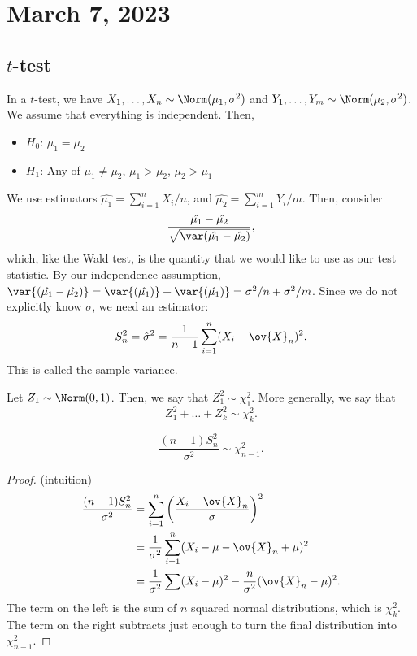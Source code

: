 \section{March 7, 2023}

\subsection{$t$-test}

In a $t$-test, we have $X_1, \hdots, X_n\sim \Norm(\mu_1, \sigma^2)$ and $Y_1, \hdots, Y_m\sim \Norm(\mu_2, \sigma^2)$. We assume that everything is independent. Then,
\begin{itemize}
    \item $H_0$: $\mu_1=\mu_2$
    \item $H_1$: Any of $\mu_1\neq \mu_2$, $\mu_1 > \mu_2$, $\mu_2 > \mu_1$
\end{itemize}

We use estimators $\hat{\mu_1} = \sum_{i=1}^nX_i/n$, and $\hat{\mu_2}=\sum_{i=1}^mY_i/m$. Then, consider
\[\frac{\hat{\mu_1}-\hat{\mu_2}}{\sqrt{\var(\hat{\mu_1}-\hat{\mu_2})}},\]
which, like the Wald test, is the quantity that we would like to use as our test statistic. By our independence assumption, $\var{(\hat{\mu_1}-\hat{\mu_2})} = \var{(\hat{\mu_1})}+\var{(\hat{\mu_1})} = \sigma^2/n + \sigma^2/m$. Since we do not explicitly know $\sigma$, we need an estimator:
\[S_n^2 = \hat{\sigma}^2 = \frac{1}{n-1}\sum_{i=1}^n(X_i-\ov{X}_n)^2.\]
This is called the sample variance. 

\begin{definition}

Let $Z_1\sim \Norm(0,1)$. Then, we say that $Z_1^2\sim \chi_1^2$. More generally, we say that 
\[Z_1^2+\hdots + Z_k^2\sim \chi_k^2.\]
\end{definition}

\begin{theorem}

\[\frac{(n-1)S_n^2}{\sigma^2} \sim \chi^2_{n-1}.\]
\end{theorem}

\begin{proof} (intuition)
\begin{align*}
    \frac{(n-1)S_n^2}{\sigma^2} &= \sum_{i=1}^n\left(\frac{X_i-\ov{X}_n}{\sigma}\right)^2 \\
    &= \frac{1}{\sigma^2}\sum_{i=1}^n(X_i-\mu-\ov{X}_n+\mu)^2 \\
    &= \frac{1}{\sigma^2}\sum(X_i-\mu)^2 - \frac{n}{\sigma^2}(\ov{X}_n-\mu)^2.
\end{align*}
The term on the left is the sum of $n$ squared normal distributions, which is $\chi_k^2$. The term on the right subtracts just enough to turn the final distribution into $\chi_{n-1}^2$.
\end{proof}

